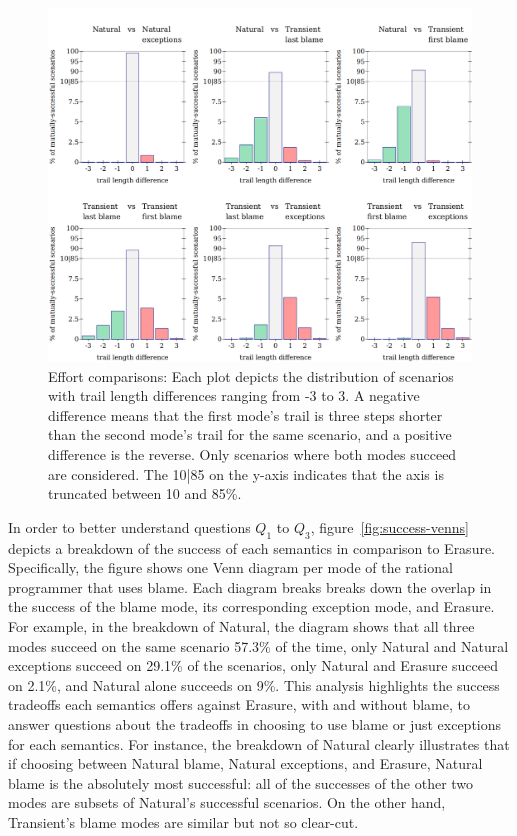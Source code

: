 \begin{figure}
  \centering
  \includegraphics[width=\textwidth]{./plots/bt-length-comparisons}
  \caption{Effort comparisons: Each plot depicts the distribution of scenarios with trail length differences ranging from -3 to 3.
  A negative difference means that the first mode's trail is three steps shorter than the second mode's trail for the same scenario, and a positive difference is the reverse.
  Only scenarios where both modes succeed are considered.
  The 10|85 on the y-axis indicates that the axis is truncated between 10 and 85\%.}
  \label{fig:effort-comparisons}
\end{figure}

In order to better understand questions $Q_1$ to $Q_3$, figure~\ref{fig:success-venns} depicts a breakdown of the success of each semantics in comparison to Erasure.
Specifically, the figure shows one Venn diagram per mode of the rational programmer that uses blame.
Each diagram breaks breaks down the overlap in the success of the blame mode, its corresponding exception mode, and Erasure.
For example, in the breakdown of Natural, the diagram shows that all three modes succeed on the same scenario 57.3\% of the time, only Natural and Natural exceptions succeed on 29.1\% of the scenarios, only Natural and Erasure succeed on 2.1\%, and Natural alone succeeds on 9\%.
This analysis highlights the success tradeoffs each semantics offers against Erasure, with and without blame, to answer questions about the tradeoffs in choosing to use blame or just exceptions for each semantics.
For instance, the breakdown of Natural clearly illustrates that if choosing between Natural blame, Natural exceptions, and Erasure, Natural blame is the absolutely most successful: all of the successes of the other two modes are subsets of Natural's successful scenarios.
On the other hand, Transient's blame modes are similar but not so clear-cut.


